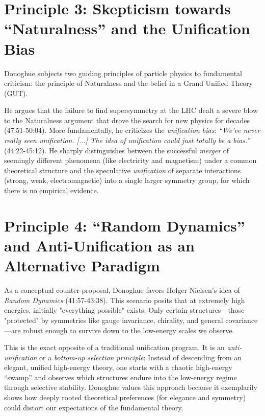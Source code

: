 	\section{Principle 3: Skepticism towards ``Naturalness'' and the Unification Bias}
	
	Donoghue subjects two guiding principles of particle physics to fundamental criticism: the principle of Naturalness and the belief in a Grand Unified Theory (GUT).
	
	He argues that the failure to find supersymmetry at the LHC dealt a severe blow to the Naturalness argument that drove the search for new physics for decades \cite{DonoghueInterview2025} (47:51-50:04). More fundamentally, he criticizes the \emph{unification bias}: \emph{``We've never really seen unification. [...] The idea of unification could just totally be a bias.''} \cite{DonoghueInterview2025} (44:22-45:12). He sharply distinguishes between the successful \emph{merger} of seemingly different phenomena (like electricity and magnetism) under a common theoretical structure and the speculative \emph{unification} of separate interactions (strong, weak, electromagnetic) into a single larger symmetry group, for which there is no empirical evidence.
	
	\section{Principle 4: ``Random Dynamics'' and Anti-Unification as an Alternative Paradigm}
	
	As a conceptual counter-proposal, Donoghue favors Holger Nielsen's idea of \emph{Random Dynamics} \cite{DonoghueInterview2025} (41:57-43:38). This scenario posits that at extremely high energies, initially "everything possible" exists. Only certain structures—those "protected" by symmetries like gauge invariance, chirality, and general covariance—are robust enough to survive down to the low-energy scales we observe.
	
	This is the exact opposite of a traditional unification program. It is an \emph{anti-unification} or a \emph{bottom-up selection principle}: Instead of descending from an elegant, unified high-energy theory, one starts with a chaotic high-energy ``swamp'' and observes which structures endure into the low-energy regime through selective stability. Donoghue values this approach because it exemplarily shows how deeply rooted theoretical preferences (for elegance and symmetry) could distort our expectations of the fundamental theory.
	
